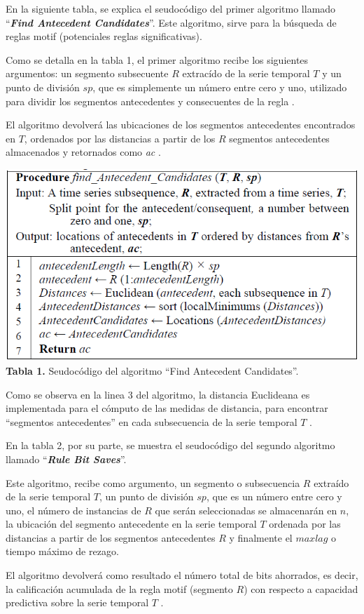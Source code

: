En la siguiente tabla, se explica el seudoc\'odigo del primer algoritmo llamado \enquote{\textit{\textbf{Find Antecedent Candidates}}}. Este algoritmo, sirve para la b\'usqueda de reglas motif (potenciales reglas significativas).\par 
Como se detalla en la tabla 1, el primer algoritmo 	recibe los siguientes argumentos: un segmento subsecuente $R$ extrac\'ido de la serie temporal $T$ y un punto de divisi\'on $sp$, que es simplemente un n\'umero entre cero y uno, utilizado para dividir los segmentos antecedentes y consecuentes de la regla \cite{main}.\par
El algoritmo devolver\'a las ubicaciones de los segmentos antecedentes encontrados en $T$, ordenados por las distancias a partir de los $R$ segmentos antecedentes almacenados y retornados como \textit{ac} \cite{main}.
\begin{center}
\includegraphics[scale=0.7]{antecedent.png}\\
\vspace*{10pt}
\footnotesize{\textbf{Tabla 1.} Seudoc\'odigo del algoritmo \enquote{Find Antecedent Candidates}.}
\end{center}
Como se observa en la linea 3 del algoritmo, la distancia Euclideana es implementada para el c\'omputo de las medidas de distancia, para encontrar \enquote{segmentos antecedentes} en cada subsecuencia de la serie temporal $T$ \cite{main}.\par
En la tabla 2, por su parte, se muestra el seudoc\'odigo del segundo algoritmo llamado \enquote{\textit{\textbf{Rule Bit Saves}}}.\par 
Este algoritmo, recibe como argumento, un segmento o subsecuencia $R$ extra\'ido de la serie temporal $T$, un punto de divisi\'on $sp$, que es un n\'umero entre cero y uno, el n\'umero de instancias de $R$ que ser\'an seleccionadas se almacenar\'an en $n$, la ubicaci\'on del segmento antecedente en la serie temporal $T$ ordenada por las distancias a partir de los segmentos antecedentes $R$ y finalmente el $maxlag$ o tiempo m\'aximo de rezago.\par El algoritmo devolver\'a como resultado el n\'umero total de bits ahorrados, es decir, la calificaci\'on acumulada de la regla motif (segmento $R$) con respecto a capacidad predictiva sobre la serie temporal $T$ \cite{main}.\par

